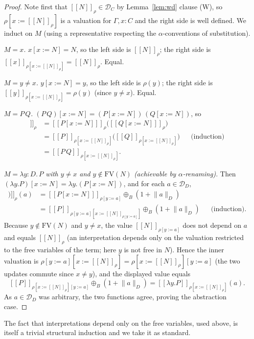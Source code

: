 \documentclass[12pt]{article}
\newcommand{\sem}[1]{[\![#1]\!]}
\newcommand{\D}{\mathcal{D}}
\newcommand{\nrm}[1]{\lVert #1\rVert}
\begin{document}
\begin{proof}
Note first that $\sem{N}_\rho\in\D_C$ by Lemma~\ref{lem:wd} clause (W), so
$\rho[x:=\sem{N}_\rho]$ is a valuation for $\Gamma,x{:}C$ and the right side is
well defined. We induct on $M$ (using a representative respecting the
$\alpha$-conventions of substitution).

\emph{$M=x$.} $x[x:=N]=N$, so the left side is $\sem{N}_\rho$; the right side is
$\sem{x}_{\rho[x:=\sem N_\rho]}=\sem{N}_\rho$. Equal.

\emph{$M=y\ne x$.} $y[x:=N]=y$, so the left side is $\rho(y)$; the right side is
$\sem{y}_{\rho[x:=\sem N_\rho]}=\rho(y)$ (since $y\ne x$). Equal.

\emph{$M=P\,Q$.} $(P\,Q)[x:=N]=(P[x:=N])\,(Q[x:=N])$, so
\begin{align*}
  \sem{(P\,Q)[x:=N]}_\rho
  &= \sem{P[x:=N]}_\rho\big(\sem{Q[x:=N]}_\rho\big)\\
  &= \sem{P}_{\rho[x:=\sem N_\rho]}\big(\sem{Q}_{\rho[x:=\sem N_\rho]}\big)
   && \text{(induction)}\\
  &= \sem{P\,Q}_{\rho[x:=\sem N_\rho]}.
\end{align*}

\emph{$M=\lambda y{:}D.\,P$ with $y\ne x$ and $y\notin\mathrm{FV}(N)$ (achievable
by $\alpha$-renaming).} Then
$(\lambda y.P)[x:=N]=\lambda y.(P[x:=N])$, and for each $a\in\D_D$,
\begin{align*}
  \sem{\lambda y.(P[x:=N])}_\rho(a)
  &= \sem{P[x:=N]}_{\rho[y:=a]}\oplus_B(1+\nrm{a}_D)\\
  &= \sem{P}_{\rho[y:=a][x:=\sem N_{\rho[y:=a]}]}\oplus_B(1+\nrm{a}_D)
   && \text{(induction).}
\end{align*}
Because $y\notin\mathrm{FV}(N)$ and $y\ne x$, the value $\sem{N}_{\rho[y:=a]}$
does not depend on $a$ and equals $\sem{N}_\rho$ (an interpretation depends only
on the valuation restricted to the free variables of the term; here $y$ is not
free in $N$). Hence the inner valuation is
$\rho[y:=a][x:=\sem N_\rho]=\rho[x:=\sem N_\rho][y:=a]$ (the two updates commute
since $x\ne y$), and the displayed value equals
\[
  \sem{P}_{\rho[x:=\sem N_\rho][y:=a]}\oplus_B(1+\nrm{a}_D)
  = \sem{\lambda y.P}_{\rho[x:=\sem N_\rho]}(a).
\]
As $a\in\D_D$ was arbitrary, the two functions agree, proving the abstraction
case.
\end{proof}

The fact that interpretations depend only on the free variables, used above, is
itself a trivial structural induction and we take it as standard.
\end{document}
